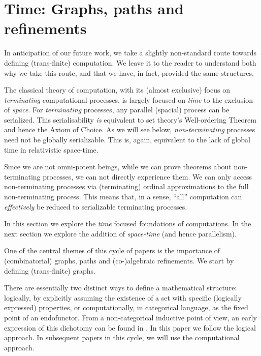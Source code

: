 
\chapter{Time: Graphs, paths and refinements}

In anticipation of our future work, we take a slightly non-standard route towards defining
(trans-finite) computation. We leave it to the reader to understand both why we take
this route, and that we have, in fact, provided the same structures.

The classical theory of computation, with its (almost exclusive) focus on
\emph{terminating} computational processes, is largely focused on \emph{time} to the
exclusion of \emph{space}. For \emph{terminating} processes, any parallel (spacial)
process can be serialized. This serialisability \emph{is} equivalent to set theory's
Well-ordering Theorem and hence the Axiom of Choice. As we will see below,
\emph{non-terminating} processes need not be globally serializable. This is, again,
equivalent to the lack of global time in relativistic space-time.

Since we are not omni-potent beings, while we can prove theorems about non-terminating 
processes, we can not directly experience them. We can only access non-terminating processes 
via (terminating) ordinal approximations to the full non-terminating process. This means 
that, in a sense, ``all'' computation can \emph{effectively} be reduced to serializable 
terminating processes. 

In this section we explore the \emph{time} focused foundations of computations. In the next 
section we explore the addition of \emph{space-time} (and hence parallelism).

One of the central themes of this cycle of papers is the importance of (combinatorial)
graphs, paths and (co-)algebraic refinements. We start by defining (trans-finite) graphs.

There are essentially two distinct ways to define a mathematical structure: logically, by
explicitly assuming the existence of a set with specific (logically expressed) properties,
or computationally, in categorical language, as the fixed point of an endofunctor. From a
non-categorical inductive point of view, an early expression of this dichotomy can be
found in \cite[page 1]{moschovakis1974induction}. In this paper we follow the logical
approach. In subsequent papers in this cycle, we will use the computational approach.

